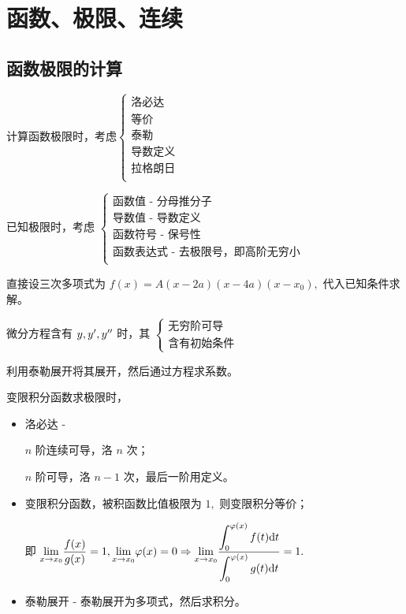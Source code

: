 \chapter{函数、极限、连续}

\section{函数极限的计算}

计算函数极限时，考虑$ \begin{cases}
    \textrm{洛必达}\\ 
    \textrm{等价}\\
    \textrm{泰勒}\\
    \textrm{导数定义}\\ 
    \textrm{拉格朗日}\\
\end{cases} $ 

已知极限时，考虑
$ \begin{cases}
    \textrm{函数值 - 分母推分子}\\
    \textrm{导数值 - 导数定义}\\
    \textrm{函数符号 - 保号性}\\
    \textrm{函数表达式 - 去极限号，即高阶无穷小}\\
\end{cases} $


直接设三次多项式为 $ f(x) = A(x-2a)(x-4a)(x-x_0), $ 
代入已知条件求解。


微分方程含有 $ y,y',y^{\prime\prime} $ 时，其
$\begin{cases}
    \textrm{无穷阶可导}\\
    \textrm{含有初始条件}
\end{cases}$

利用泰勒展开将其展开，然后通过方程求系数。


变限积分函数求极限时，
\begin{itemize}
    \item 洛必达 - 
    
    $ n $  阶连续可导，洛 $ n $ 次；

    $ n $  阶可导，洛 $ n-1 $ 次，最后一阶用定义。
    \item {}
    
    变限积分函数，被积函数比值极限为 $ 1, $ 则变限积分等价；
    
    即 $ {\displaystyle\lim_{x\rightarrow x_0}}\dfrac{f(x)}{g(x)} = 1,
    {\displaystyle\lim_{x\rightarrow x_0}}\varphi(x) = 0 \Rightarrow 
    {\displaystyle\lim_{x\rightarrow x_0}}
    \dfrac{\displaystyle\int_{0}^{\varphi(x)}f(t)\mathrm{d}t}{\displaystyle\int_{0}^{\varphi(x)}g(t)\mathrm{d}t} = 1. $ 
    \item 泰勒展开 - 泰勒展开为多项式，然后求积分。
\end{itemize}

